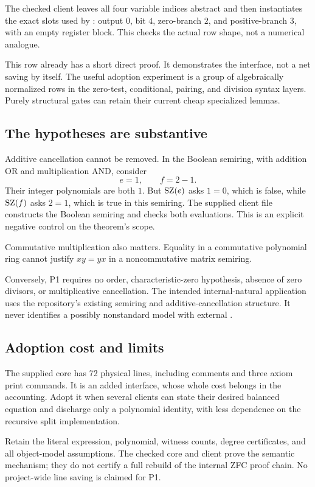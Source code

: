 The checked client leaves all four variable indices abstract and then
instantiates the exact slots used by : output $0$,
bit $4$, zero-branch $2$, and positive-branch $3$, with an empty register
block. This checks the actual row shape, not a numerical analogue.

This row already has a short direct proof. It demonstrates the interface,
not a net saving by itself. The useful adoption experiment is a group of
algebraically normalized rows in the zero-test, conditional, pairing, and
division syntax layers. Purely structural gates can retain their current
cheap specialized lemmas.

\subsection{The hypotheses are substantive}

Additive cancellation cannot be removed. In the Boolean semiring, with
addition OR and multiplication AND, consider
\[
              e=1,\qquad f=2-1.
\]
Their integer polynomials are both $1$. But $\operatorname{SZ}(e)$ asks $1=0$, which is
false, while $\operatorname{SZ}(f)$ asks $2=1$, which is true in this semiring.
The supplied client file constructs the Boolean semiring and checks both
evaluations. This is an explicit negative control on the theorem's scope.

Commutative multiplication also matters. Equality in a commutative
polynomial ring cannot justify $xy=yx$ in a noncommutative matrix semiring.

Conversely, P1 requires no order, characteristic-zero hypothesis, absence of
zero divisors, or multiplicative cancellation. The intended internal-natural
application uses the repository's existing semiring and additive-cancellation
structure. It never identifies a possibly nonstandard model with external
.

\subsection{Adoption cost and limits}

The supplied core has 72 physical lines, including comments and three axiom
print commands. It is an added interface, whose whole cost belongs in the
accounting. Adopt it when several clients can state their desired balanced
equation and discharge only a polynomial identity, with less dependence on
the recursive split implementation.

Retain the literal expression, polynomial, witness counts, degree
certificates, and all object-model assumptions. The checked core and client
prove the semantic mechanism; they do not certify a full rebuild of the
internal ZFC proof chain. No project-wide line saving is claimed for P1.
